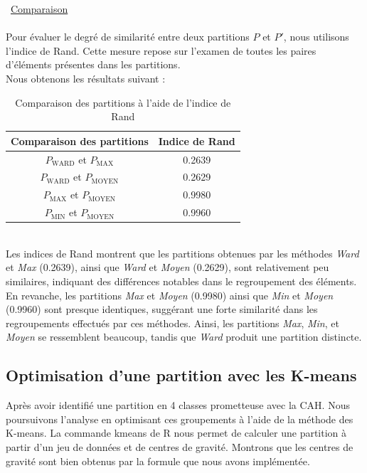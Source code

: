 \documentclass{article}
\begin{document}
\textbullet\ \underline{Comparaison}
\\\\
Pour évaluer le degré de similarité entre deux partitions \( P \) et \( P' \), nous utilisons l'indice de Rand. Cette mesure repose sur l'examen de toutes les paires d'éléments présentes dans les partitions.
\\
Nous obtenons les résultats suivant :
\begin{table}[ht]
    \centering
    \begin{tabular}{|c|c|}
    \hline
    \textbf{Comparaison des partitions} & \textbf{Indice de Rand} \\
    \hline
    \( P_{\text{WARD}} \) et \( P_{\text{MAX}} \) & 0.2639 \\
    \( P_{\text{WARD}} \) et \( P_{\text{MOYEN}} \) & 0.2629 \\
    \( P_{\text{MAX}} \) et \( P_{\text{MOYEN}} \) & 0.9980 \\
    \( P_{\text{MIN}} \) et \( P_{\text{MOYEN}} \) & 0.9960 \\
    \hline
    \end{tabular}
    \caption{Comparaison des partitions à l'aide de l'indice de Rand}
    \end{table}
\\
Les indices de Rand montrent que les partitions obtenues par les méthodes \textit{Ward} et \textit{Max} (0.2639), ainsi que \textit{Ward} et \textit{Moyen} (0.2629), sont relativement peu similaires, indiquant des différences notables dans le regroupement des éléments. En revanche, les partitions \textit{Max} et \textit{Moyen} (0.9980) ainsi que \textit{Min} et \textit{Moyen} (0.9960) sont presque identiques, suggérant une forte similarité dans les regroupements effectués par ces méthodes. Ainsi, les partitions \textit{Max}, \textit{Min}, et \textit{Moyen} se ressemblent beaucoup, tandis que \textit{Ward} produit une partition distincte.



\subsection{Optimisation d'une partition avec les K-means}
Après avoir identifié une partition en 4 classes prometteuse avec la CAH. Nous poursuivons l'analyse en optimisant ces groupements à l'aide de la méthode des K-means. 
La commande kmeans de R nous permet de calculer une partition à partir d'un jeu de 
données et de centres de gravité. Montrons que les centres de gravité sont bien obtenus par la formule que nous avons implémentée.
\end{document}
